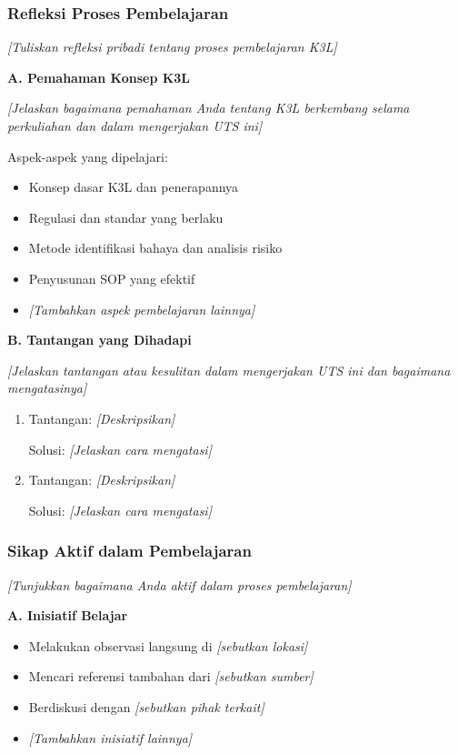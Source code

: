 \subsubsection{Refleksi Proses Pembelajaran}

\textit{[Tuliskan refleksi pribadi tentang proses pembelajaran K3L]}

\textbf{A. Pemahaman Konsep K3L}

\textit{[Jelaskan bagaimana pemahaman Anda tentang K3L berkembang selama perkuliahan dan dalam mengerjakan UTS ini]}

Aspek-aspek yang dipelajari:
\begin{itemize}
    \item Konsep dasar K3L dan penerapannya
    \item Regulasi dan standar yang berlaku
    \item Metode identifikasi bahaya dan analisis risiko
    \item Penyusunan SOP yang efektif
    \item \textit{[Tambahkan aspek pembelajaran lainnya]}
\end{itemize}

\vspace{0.5cm}

\textbf{B. Tantangan yang Dihadapi}

\textit{[Jelaskan tantangan atau kesulitan dalam mengerjakan UTS ini dan bagaimana mengatasinya]}

\begin{enumerate}
    \item Tantangan: \textit{[Deskripsikan]}
    
    Solusi: \textit{[Jelaskan cara mengatasi]}
    
    \item Tantangan: \textit{[Deskripsikan]}
    
    Solusi: \textit{[Jelaskan cara mengatasi]}
\end{enumerate}

\vspace{0.5cm}

\subsubsection{Sikap Aktif dalam Pembelajaran}

\textit{[Tunjukkan bagaimana Anda aktif dalam proses pembelajaran]}

\textbf{A. Inisiatif Belajar}

\begin{itemize}
    \item Melakukan observasi langsung di \textit{[sebutkan lokasi]}
    \item Mencari referensi tambahan dari \textit{[sebutkan sumber]}
    \item Berdiskusi dengan \textit{[sebutkan pihak terkait]}
    \item \textit{[Tambahkan inisiatif lainnya]}
\end{itemize}

